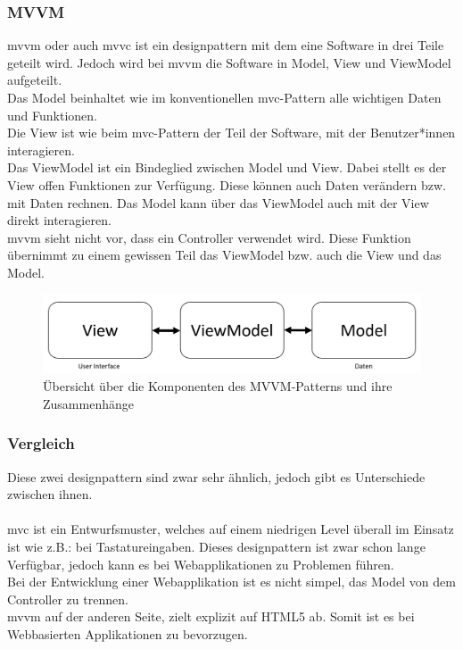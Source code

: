 \subsubsection{MVVM}
\Gls{mvvm} oder auch \Gls{mvvc} ist ein \Gls{designpattern} mit dem eine Software in drei Teile geteilt wird.\cite{mvvm_vue} Jedoch wird bei \Gls{mvvm} die Software in Model, View und ViewModel aufgeteilt.\\
Das Model beinhaltet wie im konventionellen \Gls{mvc}-Pattern alle wichtigen Daten und Funktionen.\\
Die View ist wie beim \Gls{mvc}-Pattern der Teil der Software, mit der Benutzer*innen interagieren.\\
Das ViewModel ist ein Bindeglied zwischen Model und View. Dabei stellt es der View offen Funktionen zur Verfügung. Diese können auch Daten verändern bzw. mit Daten rechnen. Das Model kann über das ViewModel auch mit der View direkt interagieren.\\
\Gls{mvvm} sieht nicht vor, dass ein Controller verwendet wird. Diese Funktion übernimmt zu einem gewissen Teil das ViewModel bzw. auch die View und das Model.
\begin{figure}[H]
	\centering
	\includegraphics[width=0.8\linewidth]{images/mvvm}
	\caption[Übersicht des MVVM-Patterns]{Übersicht über die Komponenten des MVVM-Patterns und ihre Zusammenhänge}
	\label{fig:mvvm}
\end{figure}
\newpage
\subsubsection{Vergleich}
Diese zwei \Gls{designpattern} sind zwar sehr ähnlich, jedoch gibt es Unterschiede zwischen ihnen.\\\\
\Gls{mvc} ist ein Entwurfsmuster, welches auf einem niedrigen Level überall im Einsatz ist wie z.B.: bei Tastatureingaben\cite{mvc}. Dieses \Gls{designpattern} ist zwar schon lange Verfügbar, jedoch kann es bei Webapplikationen zu Problemen führen.\\
Bei der Entwicklung einer Webapplikation ist es nicht simpel, das Model von dem Controller zu trennen.\\
\Gls{mvvm} auf der anderen Seite, zielt explizit auf HTML5 ab\cite{mvvm_vue}. Somit ist es bei Webbasierten Applikationen zu bevorzugen.
